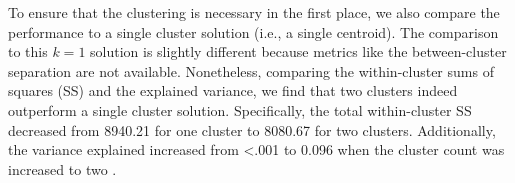To ensure that the clustering is necessary in the first place, we also
compare the performance to a single cluster solution (i.e., a single
centroid). The comparison to this \(k=1\) solution is slightly different
because metrics like the between-cluster separation are not available.
Nonetheless, comparing the within-cluster sums of squares (SS) and the
explained variance, we find that two clusters indeed outperform a single
cluster solution. Specifically, the total within-cluster SS decreased
from 8940.21 for one cluster to 8080.67 for two clusters. Additionally,
the variance explained increased from \textless.001 to 0.096 when the
cluster count was increased to two
\citep[e.g., ][; also see \situtorial\ for full results]{beijers2022}.
